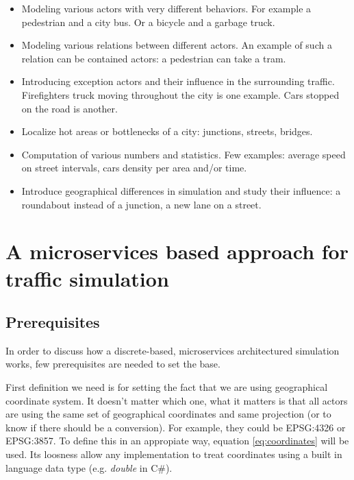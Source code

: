 \documentclass[a4paper,12pt,twoside]{book}
\begin{document}
\begin{itemize}
    \item Modeling various actors with very different behaviors. For example a pedestrian and a city bus. Or a bicycle and a garbage truck.
    \item Modeling various relations between different actors. An example of such a relation can be contained actors: a pedestrian can take a tram.
    \item Introducing exception actors and their influence in the surrounding traffic. Firefighters truck moving throughout the city is one example. Cars stopped on the road is another.
    \item Localize hot areas or bottlenecks of a city: junctions, streets, bridges.
    \item Computation of various numbers and statistics. Few examples: average speed on street intervals, cars density per area and/or time.
    \item Introduce geographical differences in simulation and study their influence: a roundabout instead of a junction, a new lane on a street.
\end{itemize}


\section{A microservices based approach for traffic simulation}
\label{sec:microservicesbasedapproachtrafficsim}

\subsection{Prerequisites}
\label{subsec:prerequisites}
In order to discuss how a discrete-based, microservices architectured simulation works, few prerequisites are needed to set the base.

First definition we need is for setting the fact that we are using geographical coordinate system. It doesn't matter which one, what it matters is that all actors are using the same set of geographical coordinates and same projection (or to know if there should be a conversion). For example, they could be EPSG:4326 or EPSG:3857. To define this in an appropiate way, equation \ref{eq:coordinates} will be used. Its loosness allow any implementation to treat coordinates using a built in language data type (e.g. \textit{double} in C\#).
\end{document}
